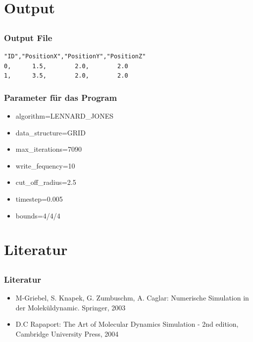 \documentclass[compress]{beamer}
\begin{document}
\section{Output}
\subsection{}
\begin{frame}[fragile]%
	\frametitle{Output File}
\begin{lstlisting}[caption=data.0.csv]
"ID","PositionX","PositionY","PositionZ"
0, 		1.5,		2.0,		2.0
1,		3.5,		2.0,		2.0
\end{lstlisting}
\end{frame}
\begin{frame}%
	\frametitle{Parameter für das Program}
	\begin{itemize}
    	\item algorithm=LENNARD\_JONES
        \item data\_structure=GRID
        \item max\_iterations=7090
        \item write\_fequency=10
        \item cut\_off\_radius=2.5
        \item timestep=0.005
        \item bounds=4/4/4
	\end{itemize}
\end{frame}
\section{Literatur}
\subsection{}
\begin{frame}
	\frametitle{Literatur}
	\begin{itemize}
        \item M-Griebel, S. Knapek, G. Zumbuschm, A. Caglar: Numerische Simulation in der Moleküldynamic. Springer, 2003
		\item D.C Rapaport: The Art of Molecular Dynamics Simulation - 2nd edition, Cambridge University Press, 2004
	\end{itemize}
\end{frame}
\end{document}
